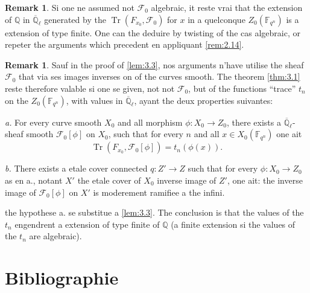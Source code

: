 \documentclass[11pt,a4paper]{article}
\theoremstyle{plain}
\theoremstyle{definition}
\newtheorem{remark}[theorem]{Remark}
\DeclareMathOperator{\tr}{Tr}
\begin{document}
\begin{remark}\label{rem:3.9}
Si one ne assumed not $\mathcal{F}_0$ algebraic, it reste vrai that the extension of $\mathbb{Q}$ in $\overline{\mathbb{Q}}_\ell$ generated by the $\tr(F_{x_0}, \mathcal{F}_0)$ for $x$ in a quelconque $Z_0(\mathbb{F}_{q^n})$ is a extension of type finite. One can the deduire by twisting of the cas algebraic, or repeter the arguments which precedent en appliquant \ref{rem:2.14}.
\end{remark}

\begin{remark}\label{rem:3.10}
Sauf in the proof of \ref{lem:3.3}, nos arguments n'have utilise the sheaf $\mathcal{F}_0$ that via ses images inverses on of the curves smooth. The theorem \ref{thm:3.1} reste therefore valable si one se given, not not $\mathcal{F}_0$, but of the functions ``trace'' $t_n$ on the $Z_0(\mathbb{F}_{q^n})$, with values in $\overline{\mathbb{Q}}_\ell$, ayant the deux properties suivantes:

\emph{a.} For every curve smooth $X_0$ and all morphism $\phi: X_0 \to Z_0$, there exists a $\overline{\mathbb{Q}}_\ell$-sheaf smooth $\mathcal{F}_0[\phi]$ on $X_0$, such that for every $n$ and all $x \in X_0(\mathbb{F}_{q^n})$ one ait
\[
\tr(F_{x_0}, \mathcal{F}_0[\phi]) = t_n(\phi(x)).
\]

\emph{b.} There exists a etale cover connected $q: Z' \to Z$ such that for every $\phi: X_0 \to Z_0$ as en a., notant $X'$ the etale cover of $X_0$ inverse image of $Z'$, one ait: the inverse image of $\mathcal{F}_0[\phi]$ on $X'$ is moderement ramifiee a the infini.

the hypothese a. se substitue a \ref{lem:3.3}. The conclusion is that the values of the $t_n$ engendrent a extension of type finite of $\mathbb{Q}$ (a finite extension si the values of the $t_n$ are algebraic).
\end{remark}

\section*{Bibliographie}
\end{document}
